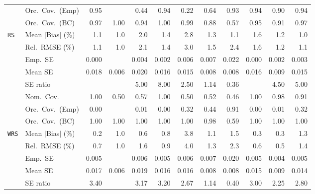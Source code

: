 \begin{landscape}
\begin{longtable}{llrrrrrrrrrr}
 & Orc.\ Cov.\ (Emp) & \cellcolor{rankone}0.95 &  & 0.44 & 0.94 & 0.22 & 0.64 & 0.93 & \cellcolor{ranktwo}0.94 & 0.90 & \cellcolor{rankthree}0.94 \\
 & Orc.\ Cov.\ (BC) & \cellcolor{rankthree}0.97 & 1.00 & \cellcolor{ranktwo}0.94 & 1.00 & 0.99 & 0.88 & 0.57 & \cellcolor{rankone}0.95 & 0.91 & 0.97 \\
\addlinespace[2pt]
\quad \texttt{RS} & Mean $|$Bias$|$ (\%) & \cellcolor{rankthree}1.1 & \cellcolor{rankone}1.0 & 2.0 & 1.4 & 2.8 & 1.3 & 1.1 & 1.6 & 1.2 & \cellcolor{ranktwo}1.0 \\
 & Rel.\ RMSE (\%) & \cellcolor{ranktwo}1.1 & \cellcolor{rankone}1.0 & 2.1 & 1.4 & 3.0 & 1.5 & 2.4 & 1.6 & 1.2 & \cellcolor{rankthree}1.1 \\
 & Emp.\ SE & 0.000 &  & 0.004 & 0.002 & 0.006 & 0.007 & 0.022 & 0.000 & 0.002 & 0.003 \\
 & Mean SE & 0.018 & 0.006 & 0.020 & 0.016 & 0.015 & 0.008 & 0.008 & 0.016 & 0.009 & 0.015 \\
 & SE ratio &  &  & 5.00 & 8.00 & \cellcolor{rankthree}2.50 & \cellcolor{rankone}1.14 & \cellcolor{ranktwo}0.36 &  & 4.50 & 5.00 \\
 & Nom.\ Cov. & \cellcolor{rankthree}1.00 & 0.50 & 0.57 & 1.00 & 0.50 & 0.52 & 0.46 & 1.00 & \cellcolor{rankone}0.98 & \cellcolor{ranktwo}0.91 \\
 & Orc.\ Cov.\ (Emp) & 0.00 &  & 0.01 & 0.00 & 0.32 & \cellcolor{ranktwo}0.44 & \cellcolor{rankone}0.91 & 0.00 & 0.01 & \cellcolor{rankthree}0.32 \\
 & Orc.\ Cov.\ (BC) & \cellcolor{ranktwo}1.00 & \cellcolor{rankthree}1.00 & 1.00 & 1.00 & 1.00 & \cellcolor{rankone}0.98 & 0.59 & 1.00 & 1.00 & 1.00 \\
\addlinespace[2pt]
\quad \texttt{WRS} & Mean $|$Bias$|$ (\%) & \cellcolor{rankone}0.2 & 1.0 & 0.6 & 0.8 & 3.8 & 1.1 & 1.5 & \cellcolor{rankthree}0.3 & \cellcolor{ranktwo}0.3 & 1.3 \\
 & Rel.\ RMSE (\%) & \cellcolor{rankthree}0.7 & 1.0 & 1.6 & 0.9 & 4.0 & 1.3 & 2.3 & \cellcolor{ranktwo}0.6 & \cellcolor{rankone}0.5 & 1.4 \\
 & Emp.\ SE & 0.005 &  & 0.006 & 0.005 & 0.006 & 0.007 & 0.020 & 0.005 & 0.004 & 0.005 \\
 & Mean SE & 0.017 & 0.006 & 0.019 & 0.016 & 0.016 & 0.008 & 0.008 & 0.015 & 0.009 & 0.014 \\
 & SE ratio & 3.40 &  & 3.17 & 3.20 & 2.67 & \cellcolor{rankone}1.14 & \cellcolor{ranktwo}0.40 & 3.00 & \cellcolor{rankthree}2.25 & 2.80 \\

\end{longtable}
\end{landscape}
